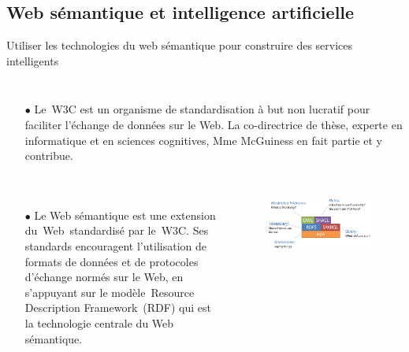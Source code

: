 \documentclass[xcolor=dvipsnames]{beamer}
\begin{document}
\subsection{Web sémantique et intelligence artificielle}
\begin{frame}{Utiliser les technologies du web sémantique pour construire des services intelligents}
\begin{columns}
	\small{
	\begin{itemize}
	\item[$\bullet$]Le W3C est un organisme de standardisation à but non lucratif pour faciliter l'échange de données sur le Web. La co-directrice de thèse, experte en informatique et en sciences cognitives, Mme McGuiness en fait partie et y contribue.
	\end{itemize}}
	\vspace{-0.4cm}
\end{columns}
	\begin{columns}
	\small{
	\begin{itemize}
		\item[$\bullet$]Le Web sémantique est une extension du Web standardisé par le W3C. Ses standards encouragent l'utilisation de formats de données et de protocoles d'échange normés sur le Web, en s'appuyant sur le modèle Resource Description Framework (RDF) qui est la technologie centrale du Web sémantique. 
	\end{itemize}}
	\vspace{3cm}
	\begin{figure}[ht]
		\begin{center}
			\includegraphics[width=\textwidth]{./images/Semantic_Web.png}
		\end{center}
	\end{figure}
	\vspace{4cm}
\end{columns}
\end{frame}
\end{document}
